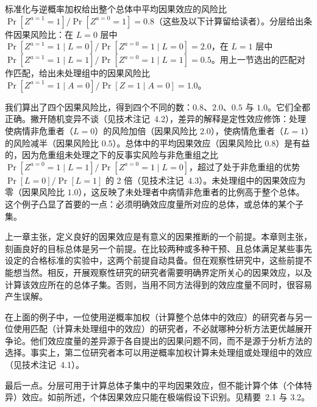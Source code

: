 标准化与逆概率加权给出整个总体中平均因果效应的风险比 $\Pr[Z^{a=1}=1]/\Pr[Z^{a=0}=1]=0.8$（这些及以下计算留给读者）。分层给出条件因果风险比：在 $L=0$ 层中 $\Pr[Z^{a=1}=1\mid L=0]/\Pr[Z^{a=0}=1\mid L=0]=2.0$，在 $L=1$ 层中 $\Pr[Z^{a=1}=1\mid L=1]/\Pr[Z^{a=0}=1\mid L=1]=0.5$。用上一节选出的匹配对作匹配，给出未处理组中的因果风险比 $\Pr[Z^{a=1}=1\mid A=0]/\Pr[Z=1\mid A=0]=1.0$。

我们算出了四个因果风险比，得到四个不同的数：$0.8$、$2.0$、$0.5$ 与 $1.0$。它们全都正确。撇开随机变异不谈（见技术注记~4.2），差异的解释是定性效应修饰：处理使病情非危重者（$L=0$）的风险加倍（因果风险比 $2.0$），使病情危重者（$L=1$）的风险减半（因果风险比 $0.5$）。总体中的平均因果效应（因果风险比 $0.8$）是有益的，因为危重组未处理之下的反事实风险与非危重组之比 $\Pr[Z^{a=0}=1\mid L=1]/\Pr[Z^{a=0}=1\mid L=0]$，超过了处于非危重组的优势 $\Pr[L=0]/\Pr[L=1]$ 的 2 倍（见技术注记~4.3）。未处理组中的因果效应为零（因果风险比 $1.0$），这反映了未处理者中病情非危重者的比例高于整个总体。这个例子凸显了首要的一点：必须明确效应度量所对应的总体，或总体的某个子集。

上一章主张，定义良好的因果效应是有意义的因果推断的一个前提。本章则主张，刻画良好的目标总体是另一个前提。在比较两种或多种干预、且总体满足某些事先设定的合格标准的实验中，这两个前提自动具备。但在观察性研究中，这些前提不能想当然。相反，开展观察性研究的研究者需要明确界定所关心的因果效应，以及计算该效应所在的总体子集。否则，当用不同方法得到的效应度量不同时，很容易产生误解。

在上面的例子中，一位使用逆概率加权（计算整个总体中的效应）的研究者与另一位使用匹配（计算未处理组中的效应）的研究者，不必就哪种分析方法更优越展开争论。他们效应度量的差异源于各自提出的因果问题不同，而不是源于分析方法的选择。事实上，第二位研究者本可以用逆概率加权计算未处理组或处理组中的效应（见技术注记~4.1）。

最后一点。分层可用于计算总体子集中的平均因果效应，但不能计算个体（个体特异）效应。如前所述，个体因果效应只能在极端假设下识别。见精要~2.1 与 3.2。

